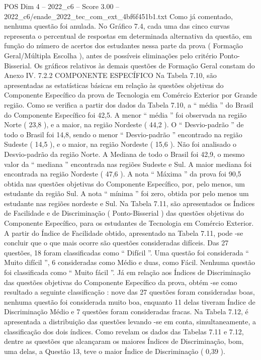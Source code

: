 \begin{textsample}{POS Dim 4 – 2022\_c6 – Score 3.00 – 2022\_c6/enade\_2022\_tec\_com\_ext\_4bf6f451b1.txt}
Como já comentado, nenhuma questão foi anulada.
No Gráfico 7.4, cada uma das cinco curvas representa o percentual de respostas em determinada alternativa da questão, em função do número de acertos dos estudantes nessa parte da prova ( Formação Geral/Múltipla Escolha ), antes de possíveis eliminações pelo critério Ponto-Bisserial.
Os gráficos relativos às demais questões de Formação Geral constam do Anexo IV. 7.2.2 COMPONENTE ESPECÍFICO Na Tabela 7.10, são apresentadas as estatísticas básicas em relação às questões objetivas do Componente Específico da prova de Tecnologia em Comércio Exterior por Grande região.
Como se verifica a partir dos dados da Tabela 7.10, a “ média ” do Brasil do Componente Específico foi 42,5.
A menor “ média ” foi observada na região Norte ( 23,8 ), e a maior, na região Nordeste ( 44,2 ).
O “ Desvio-padrão ” de todo o Brasil foi 14,8, sendo o menor “ Desvio-padrão ” encontrado na região Sudeste ( 14,5 ), e o maior, na região Nordeste ( 15,6 ).
Não foi analisado o Desvio-padrão da região Norte.
A Mediana de todo o Brasil foi 42,9, o mesmo valor da “ mediana ” encontrada nas regiões Sudeste e Sul.
A maior mediana foi encontrada na região Nordeste ( 47,6 ).
A nota “ Máxima ” da prova foi 90,5 obtida nas questões objetivas do Componente Específico, por, pelo menos, um estudante da região Sul.
A nota “ mínima ” foi zero, obtida por pelo menos um estudante nas regiões nordeste e Sul.
Na Tabela 7.11, são apresentados os Índices de Facilidade e de Discriminação ( Ponto-Bisserial ) das questões objetivas do Componente Específico, para os estudantes de Tecnologia em Comércio Exterior.
A partir do Índice de Facilidade obtido, apresentado na Tabela 7.11, pode -se concluir que o que mais ocorre são questões consideradas difíceis.
Das 27 questões, 18 foram classificadas como “ Difícil ”.
Uma questão foi considerada “ Muito difícil ”, 6 consideradas como Médio e duas, como Fácil.
Nenhuma questão foi classificada como “ Muito fácil ”.
Já em relação aos Índices de Discriminação das questões objetivas do Componente Específico da prova, obtém -se como resultado a seguinte classificação : nove das 27 questões foram consideradas boas, nenhuma questão foi considerada muito boa, enquanto 11 delas tiveram Índice de Discriminação Médio e 7 questões foram consideradas fracas.
Na Tabela 7.12, é apresentada a distribuição das questões levando -se em conta, simultaneamente, a classificação dos dois índices.
Como revelam os dados das Tabelas 7.11 e 7.12, dentre as questões que alcançaram os maiores Índices de Discriminação, bom, uma delas, a Questão 13, teve o maior Índice de Discriminação ( 0,39 ).

\end{textsample}
